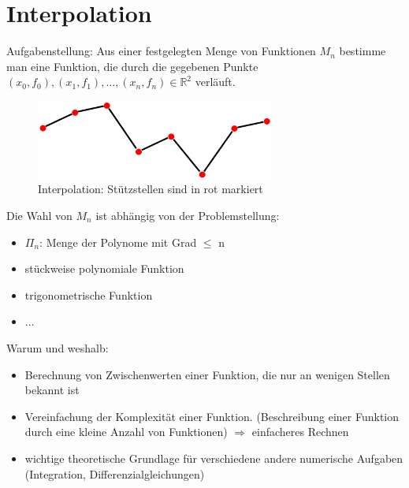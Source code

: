 \section{Interpolation}
Aufgabenstellung: Aus einer festgelegten Menge von Funktionen $M_n$ 
bestimme man eine Funktion, die durch die gegebenen Punkte
$(x_0, f_0), (x_1, f_1), \ldots, (x_n, f_n) \in \mathbb{R}^2$ verläuft.

\begin{figure}[htbp]
  \centering
  \includegraphics[width=0.7\textwidth]{figures/interpolation.png}
  \caption{Interpolation: Stützstellen sind in rot markiert}
  \label{fig:interpolation}
\end{figure}

Die Wahl von $M_n$ ist abhängig von der Problemstellung:
\begin{itemize}
  \item $\Pi_n$: Menge der Polynome mit Grad $\leq$ n
  \item stückweise polynomiale Funktion
  \item trigonometrische Funktion
	\item $\ldots$
\end{itemize}
Warum und weshalb:
\begin{itemize}
  \item Berechnung von Zwischenwerten einer Funktion, die nur an wenigen 
    Stellen bekannt ist
  \item Vereinfachung der Komplexität einer Funktion. (Beschreibung
    einer Funktion durch eine kleine Anzahl von Funktionen) $\Rightarrow$
    einfacheres Rechnen
  \item wichtige theoretische Grundlage für verschiedene andere numerische
    Aufgaben (Integration, Differenzialgleichungen)
\end{itemize}

